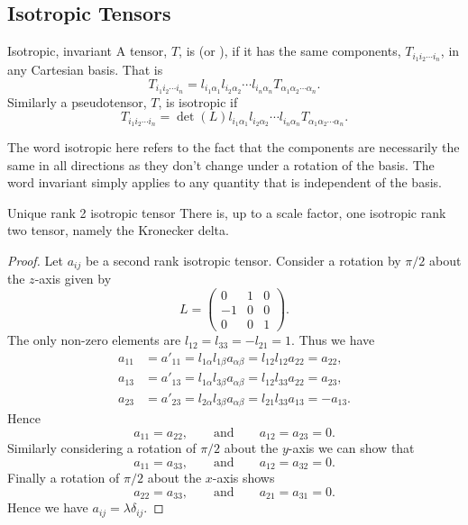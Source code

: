 \documentclass[a4paper]{article}
\newcommand{\nindices}[2]{{ {#1}_1 {#1}_2 \dotsm {#1}_{#2} }}
\begin{document}
    \subsection{Isotropic Tensors}
    \begin{definition}{Isotropic, invariant}{}
        A tensor, \(T\), is  (or ), if it has the same components, \(T_{\nindices{i}{n}}\), in any Cartesian basis.
        That is
        \[T_{\nindices{i}{n}} = l_{i_1\alpha_1} l_{i_2\alpha_2}\dotsm l_{i_n\alpha_n} T_{\nindices{\alpha}{n}}.\]
        Similarly a pseudotensor, \(T\), is isotropic if
        \[T_{\nindices{i}{n}} = \det(L)l_{i_1\alpha_1} l_{i_2\alpha_2}\dotsm l_{i_n\alpha_n} T_{\nindices{\alpha}{n}}.\]
    \end{definition}
    The word isotropic here refers to the fact that the components are necessarily the same in all directions as they don't change under a rotation of the basis.
    The word invariant simply applies to any quantity that is independent of the basis.
    
    \begin{theorem}{Unique rank 2 isotropic tensor}{}
        There is, up to a scale factor, one isotropic rank two tensor, namely the Kronecker delta.
    \end{theorem}
    \begin{proof}
        Let \(a_{ij}\) be a second rank isotropic tensor.
        Consider a rotation by \(\pi/2\) about the \(z\)-axis given by
        \[
            L =
            \begin{pmatrix}
                0 & 1 & 0\\
                -1 & 0 & 0\\
                0 & 0 & 1
            \end{pmatrix}
            .
        \]
        The only non-zero elements are \(l_{12} = l_{33} = -l_{21} = 1\).
        Thus we have
        \begin{align*}
            a_{11} &= a'_{11} = l_{1\alpha}l_{1\beta}a_{\alpha\beta} = l_{12}l_{12}a_{22} = a_{22},\\
            a_{13} &= a'_{13} = l_{1\alpha}l_{3\beta}a_{\alpha\beta} = l_{12}l_{33}a_{22} = a_{23},\\
            a_{23} &= a'_{23} = l_{2\alpha}l_{3\beta}a_{\alpha\beta} = l_{21}l_{33}a_{13} = -a_{13}.
        \end{align*}
        Hence
        \[a_{11} = a_{22}, \qquad\text{and}\qquad a_{12} = a_{23} = 0.\]
        Similarly considering a rotation of \(\pi/2\) about the \(y\)-axis we can show that 
        \[a_{11} = a_{33}, \qquad\text{and}\qquad a_{12} = a_{32} = 0.\]
        Finally a rotation of \(\pi/2\) about the \(x\)-axis shows
        \[a_{22} = a_{33}, \qquad\text{and}\qquad a_{21} = a_{31} = 0.\]
        Hence we have \(a_{ij} = \lambda \delta_{ij}\).
    \end{proof}
    
\end{document}
